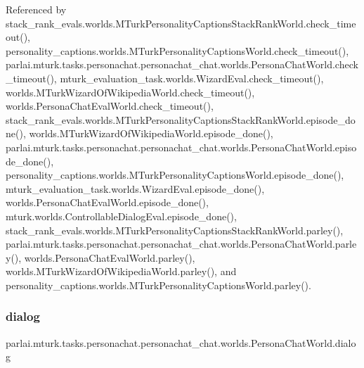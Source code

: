 Referenced by stack\+\_\+rank\+\_\+evals.\+worlds.\+M\+Turk\+Personality\+Captions\+Stack\+Rank\+World.\+check\+\_\+timeout(), personality\+\_\+captions.\+worlds.\+M\+Turk\+Personality\+Captions\+World.\+check\+\_\+timeout(), parlai.\+mturk.\+tasks.\+personachat.\+personachat\+\_\+chat.\+worlds.\+Persona\+Chat\+World.\+check\+\_\+timeout(), mturk\+\_\+evaluation\+\_\+task.\+worlds.\+Wizard\+Eval.\+check\+\_\+timeout(), worlds.\+M\+Turk\+Wizard\+Of\+Wikipedia\+World.\+check\+\_\+timeout(), worlds.\+Persona\+Chat\+Eval\+World.\+check\+\_\+timeout(), stack\+\_\+rank\+\_\+evals.\+worlds.\+M\+Turk\+Personality\+Captions\+Stack\+Rank\+World.\+episode\+\_\+done(), worlds.\+M\+Turk\+Wizard\+Of\+Wikipedia\+World.\+episode\+\_\+done(), parlai.\+mturk.\+tasks.\+personachat.\+personachat\+\_\+chat.\+worlds.\+Persona\+Chat\+World.\+episode\+\_\+done(), personality\+\_\+captions.\+worlds.\+M\+Turk\+Personality\+Captions\+World.\+episode\+\_\+done(), mturk\+\_\+evaluation\+\_\+task.\+worlds.\+Wizard\+Eval.\+episode\+\_\+done(), worlds.\+Persona\+Chat\+Eval\+World.\+episode\+\_\+done(), mturk.\+worlds.\+Controllable\+Dialog\+Eval.\+episode\+\_\+done(), stack\+\_\+rank\+\_\+evals.\+worlds.\+M\+Turk\+Personality\+Captions\+Stack\+Rank\+World.\+parley(), parlai.\+mturk.\+tasks.\+personachat.\+personachat\+\_\+chat.\+worlds.\+Persona\+Chat\+World.\+parley(), worlds.\+Persona\+Chat\+Eval\+World.\+parley(), worlds.\+M\+Turk\+Wizard\+Of\+Wikipedia\+World.\+parley(), and personality\+\_\+captions.\+worlds.\+M\+Turk\+Personality\+Captions\+World.\+parley().

\mbox{\label{classparlai_1_1mturk_1_1tasks_1_1personachat_1_1personachat__chat_1_1worlds_1_1PersonaChatWorld_a8371a48d12812df08bfd082ece010595}} 
\subsubsection{\texorpdfstring{dialog}{dialog}}
{\footnotesize\ttfamily parlai.\+mturk.\+tasks.\+personachat.\+personachat\+\_\+chat.\+worlds.\+Persona\+Chat\+World.\+dialog}



